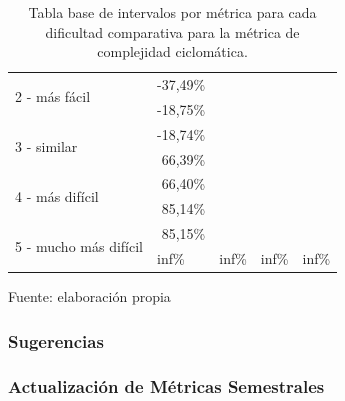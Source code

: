 \documentclass[letterpaper,12pt]{article}
\begin{document}
\begin{enumerate}
\begin{table}[H]
\begin{tabular}{|l|r|l|l|l|}
            \multirow{2}{*}{2 - más fácil}         & -37,49\%                                              &                        &                   &                  \\ \cline{2-5}
                                                   & -18,75\%                                              &                        &                   &                  \\ \hline
            \multirow{2}{*}{3 - similar}           & -18,74\%                                              &                        &                   &                  \\ \cline{2-5}
                                                   & 66,39\%                                               &                        &                   &                  \\ \hline
            \multirow{2}{*}{4 - más difícil}       & 66,40\%                                               &                        &                   &                  \\ \cline{2-5}
                                                   & 85,14\%                                               &                        &                   &                  \\ \hline
            \multirow{2}{*}{5 - mucho más difícil} & 85,15\%                                               &                        &                   &                  \\ \cline{2-5}
                                                   & \multicolumn{1}{l|}{inf\%}                            & inf\%                  & inf\%             & inf\%            \\ \hline
          \end{tabular}
          \caption{Tabla base de intervalos por métrica para cada dificultad comparativa para la métrica de complejidad ciclomática.} Fuente: elaboración propia
          \label{tab:base-int-table-4}
        \end{table}
\end{enumerate}

\subsubsection{Sugerencias}
\subsubsection{Actualización de Métricas Semestrales}
\end{document}
